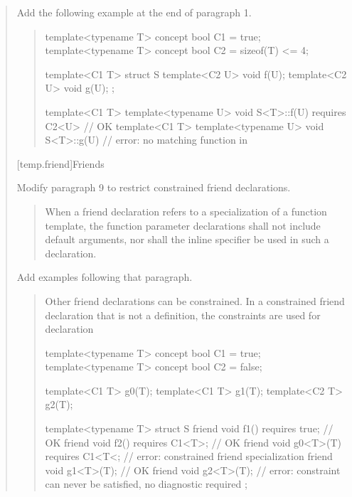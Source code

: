 \begin{quote}
Add the following example at the end of paragraph 1.

\begin{quote}
\begin{addedblock}
\enterexample
\begin{codeblock}
template<typename T> concept bool C1 = true;
template<typename T> concept bool C2 = sizeof(T) <= 4;

template<C1 T>
  struct S {
    template<C2 U> void f(U);
    template<C2 U> void g(U);
  };

template<C1 T> template<typename U> 
  void S<T>::f(U) requires C2<U> { } // OK
template<C1 T> template<typename U> 
  void S<T>::g(U) { }                // error: no matching function in 
\end{codeblock}
\exitexample
\end{addedblock}
\end{quote}


\setcounter{subsection}{3}
[temp.friend]{Friends}

Modify paragraph 9 to restrict constrained friend declarations.

\begin{quote}
\setcounter{Paras}{8}
\pnum
When a friend declaration refers to a specialization of a function
template, the function parameter declarations shall not include
default arguments,  nor shall the inline specifier be used in such a
declaration.
\end{quote}

Add examples following that paragraph.

\begin{quote}
\begin{addedblock}
\pnum
\enternote
Other friend declarations can be constrained. In a constrained friend 
declaration that is not a definition, the constraints are used for declaration
\exitnote
\enterexample
\begin{codeblock}
template<typename T> concept bool C1 = true;
template<typename T> concept bool C2 = false;

template<C1 T> g0(T);
template<C1 T> g1(T);
template<C2 T> g2(T);

template<typename T>
  struct S {
    friend void f1() requires true;      // OK
    friend void f2() requires C1<T>;     // OK
    friend void g0<T>(T) requires C1<T<; // error: constrained friend specialization
    friend void g1<T>(T);                // OK
    friend void g2<T>(T);                // error: constraint can never be satisfied, no diagnostic required
  };


\end{codeblock}
\end{addedblock}
\end{quote}
\end{quote}
